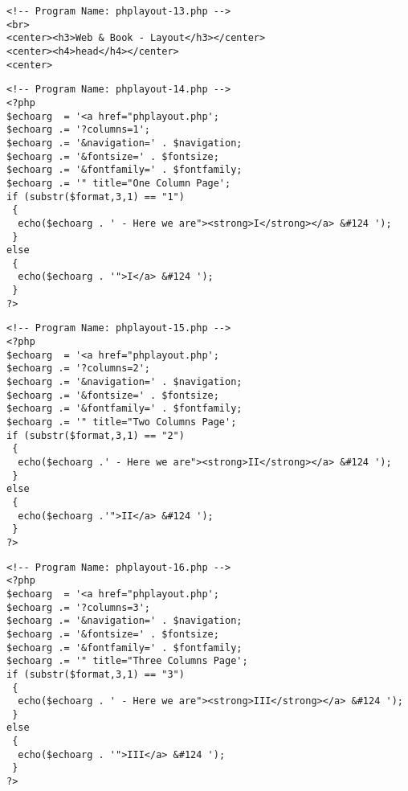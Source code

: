 \documentclass[12pt,a4paper,twosides,ngerman]{scrbook}
\begin{document}
\begin{center}
\begin{minipage}[t]{155mm}
\begin{lstlisting}[captionpos=b, caption=Layout - phplayout-13.php]
<!-- Program Name: phplayout-13.php -->
<br>
<center><h3>Web & Book - Layout</h3></center>
<center><h4>head</h4></center>
<center>
\end{lstlisting}
\end{minipage}
\end{center} 

\begin{center}
\begin{minipage}[t]{155mm}
\begin{lstlisting}[captionpos=b, caption=Layout - phplayout-14.php]
<!-- Program Name: phplayout-14.php -->
<?php
$echoarg  = '<a href="phplayout.php';
$echoarg .= '?columns=1'; 
$echoarg .= '&navigation=' . $navigation;
$echoarg .= '&fontsize=' . $fontsize;
$echoarg .= '&fontfamily=' . $fontfamily;
$echoarg .= '" title="One Column Page';
if (substr($format,3,1) == "1")
 {
  echo($echoarg . ' - Here we are"><strong>I</strong></a> &#124 ');
 }
else
 {
  echo($echoarg . '">I</a> &#124 ');
 }
?>
\end{lstlisting}
\end{minipage}
\end{center} 

\begin{center}
\begin{minipage}[t]{155mm}
\begin{lstlisting}[captionpos=b, caption=Layout - phplayout-15.php]
<!-- Program Name: phplayout-15.php -->
<?php
$echoarg  = '<a href="phplayout.php';
$echoarg .= '?columns=2'; 
$echoarg .= '&navigation=' . $navigation;
$echoarg .= '&fontsize=' . $fontsize;
$echoarg .= '&fontfamily=' . $fontfamily;
$echoarg .= '" title="Two Columns Page';
if (substr($format,3,1) == "2")
 {
  echo($echoarg .' - Here we are"><strong>II</strong></a> &#124 ');
 }
else
 {
  echo($echoarg .'">II</a> &#124 ');
 }
?>
\end{lstlisting}
\end{minipage}
\end{center} 

\begin{center}
\begin{minipage}[t]{155mm}
\begin{lstlisting}[captionpos=b, caption=Layout - phplayout-16.php]
<!-- Program Name: phplayout-16.php -->
<?php
$echoarg  = '<a href="phplayout.php';
$echoarg .= '?columns=3'; 
$echoarg .= '&navigation=' . $navigation;
$echoarg .= '&fontsize=' . $fontsize;
$echoarg .= '&fontfamily=' . $fontfamily;
$echoarg .= '" title="Three Columns Page';
if (substr($format,3,1) == "3")
 {
  echo($echoarg . ' - Here we are"><strong>III</strong></a> &#124 ');
 }
else
 {
  echo($echoarg . '">III</a> &#124 ');
 }
?>
\end{lstlisting}
\end{minipage}
\end{center} 
\end{document}
